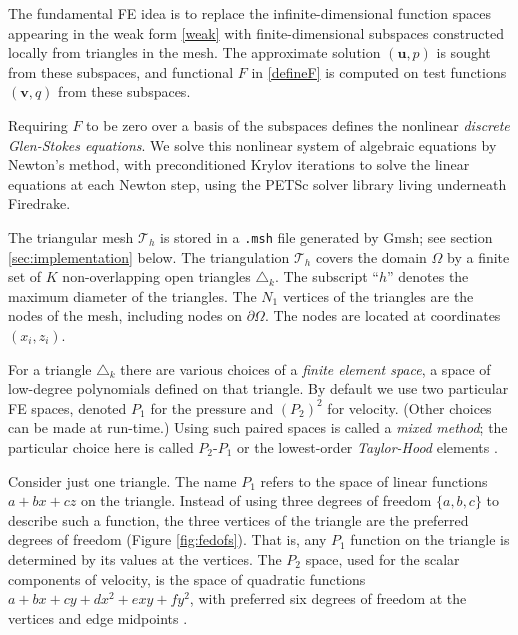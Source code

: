 \documentclass[letterpaper,final,12pt,reqno]{amsart}
\newcommand{\bu}{\mathbf{u}}
\newcommand{\bv}{\mathbf{v}}
\begin{document}
The fundamental FE idea is to replace the infinite-dimensional function spaces appearing in the weak form \eqref{weak} with finite-dimensional subspaces constructed locally from triangles in the mesh.  The approximate solution $(\bu,p)$ is sought from these subspaces, and functional $F$ in \eqref{defineF} is computed on test functions $(\bv,q)$ from these subspaces.

Requiring $F$ to be zero over a basis of the subspaces defines the nonlinear \emph{discrete Glen-Stokes equations}.  We solve this nonlinear system of algebraic equations by Newton's method, with preconditioned Krylov iterations to solve the linear equations at each Newton step, using the PETSc solver library \cite{Balayetal2018,Bueler2021} living underneath Firedrake.

The triangular mesh $\mathcal{T}_h$ is stored in a \texttt{.msh} file generated by Gmsh; see section \ref{sec:implementation} below.  The triangulation $\mathcal{T}_h$ covers the domain $\Omega$ by a finite set of $K$ non-overlapping open triangles $\triangle_k$.  The subscript ``$h$'' denotes the maximum diameter of the triangles.  The $N_1$ vertices of the triangles are the nodes of the mesh, including nodes on $\partial\Omega$.  The nodes are located at coordinates $(x_i,z_i)$.

For a triangle $\triangle_k$ there are various choices of a \emph{finite element space}, a space of low-degree polynomials defined on that triangle.  By default we use two particular FE spaces, denoted $P_1$ for the pressure and $(P_2)^2$ for velocity.  (Other choices can be made at run-time.)  Using such paired spaces is called a \emph{mixed method}; the particular choice here is called $P_2$-$P_1$ or the lowest-order \emph{Taylor-Hood} elements \cite{Elmanetal2014}.

Consider just one triangle.  The name $P_1$ refers to the space of linear functions $a + b x + c z$ on the triangle.  Instead of using three degrees of freedom $\{a,b,c\}$ to describe such a function, the three vertices of the triangle are the preferred degrees of freedom (Figure \ref{fig:fedofs}).  That is, any $P_1$ function on the triangle is determined by its values at the vertices.  The $P_2$ space, used for the scalar components of velocity, is the space of quadratic functions $a + bx + cy + dx^2 + exy + fy^2$, with preferred six degrees of freedom at the vertices and edge midpoints \cite{Elmanetal2014}.
\end{document}
